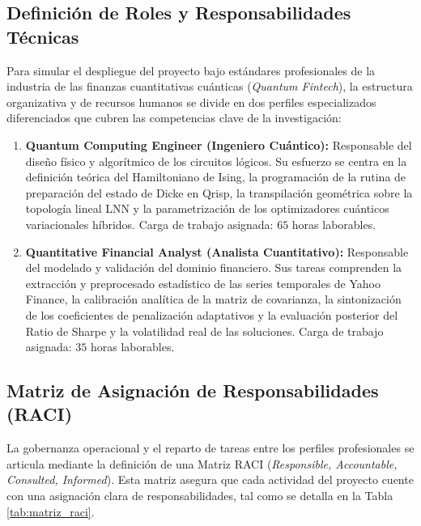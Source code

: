 \subsection{Definición de Roles y Responsabilidades Técnicas}
Para simular el despliegue del proyecto bajo estándares profesionales de la industria de las finanzas cuantitativas cuánticas (\textit{Quantum Fintech}), la estructura organizativa y de recursos humanos se divide en dos perfiles especializados diferenciados que cubren las competencias clave de la investigación:
\begin{enumerate}
    \item \textbf{Quantum Computing Engineer (Ingeniero Cuántico):} Responsable del diseño físico y algorítmico de los circuitos lógicos. Su esfuerzo se centra en la definición teórica del Hamiltoniano de Ising, la programación de la rutina de preparación del estado de Dicke en Qrisp, la transpilación geométrica sobre la topología lineal LNN y la parametrización de los optimizadores cuánticos variacionales híbridos. Carga de trabajo asignada: $65$ horas laborables.
    \item \textbf{Quantitative Financial Analyst (Analista Cuantitativo):} Responsable del modelado y validación del dominio financiero. Sus tareas comprenden la extracción y preprocesado estadístico de las series temporales de Yahoo Finance, la calibración analítica de la matriz de covarianza, la sintonización de los coeficientes de penalización adaptativos y la evaluación posterior del Ratio de Sharpe y la volatilidad real de las soluciones. Carga de trabajo asignada: $35$ horas laborables.
\end{enumerate}

\subsection{Matriz de Asignación de Responsabilidades (RACI)}
La gobernanza operacional y el reparto de tareas entre los perfiles profesionales se articula mediante la definición de una Matriz RACI (\textit{Responsible, Accountable, Consulted, Informed}). Esta matriz asegura que cada actividad del proyecto cuente con una asignación clara de responsabilidades, tal como se detalla en la Tabla \ref{tab:matriz_raci}.

